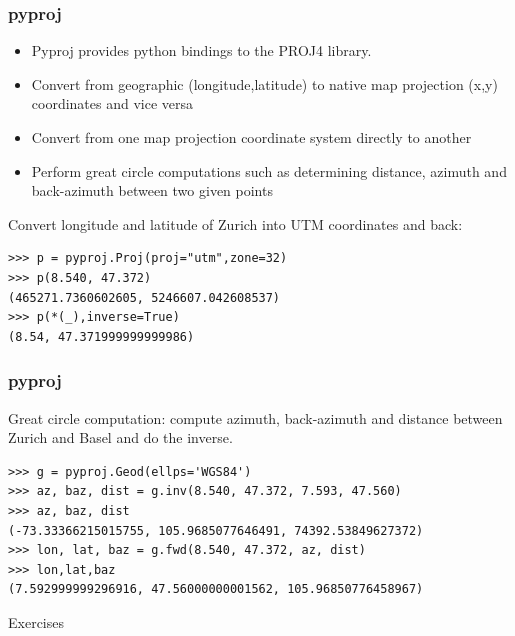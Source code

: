 \begin{frame}[fragile]
\frametitle{pyproj}
\begin{itemize}
  \item Pyproj provides python bindings to the PROJ4 library.
  \item Convert from geographic (longitude,latitude)
	to native map projection (x,y) coordinates and vice versa
   \item Convert from one map projection coordinate system directly to another
   \item Perform great circle computations such as determining distance, azimuth
   and back-azimuth between two given points
\end{itemize}

Convert longitude and latitude of Zurich into UTM coordinates and back:
 \begin{myColorBox}{0.9}{}
\begin{verbatim}
>>> p = pyproj.Proj(proj="utm",zone=32)
>>> p(8.540, 47.372)
(465271.7360602605, 5246607.042608537)
>>> p(*(_),inverse=True)
(8.54, 47.371999999999986)
\end{verbatim}
\end{myColorBox}
\end{frame}

\begin{frame}[fragile]
\frametitle{pyproj}
Great circle computation: compute azimuth, back-azimuth and distance between
Zurich and Basel and do the inverse.
\begin{myColorBox}{1.0}{}
\begin{verbatim}
>>> g = pyproj.Geod(ellps='WGS84')
>>> az, baz, dist = g.inv(8.540, 47.372, 7.593, 47.560)
>>> az, baz, dist
(-73.33366215015755, 105.9685077646491, 74392.53849627372)
>>> lon, lat, baz = g.fwd(8.540, 47.372, az, dist)
>>> lon,lat,baz
(7.592999999296916, 47.56000000001562, 105.96850776458967)
\end{verbatim}
\end{myColorBox}
\end{frame}

\begin{frame}
\begin{center}
\Huge{Exercises}
\end{center}
\end{frame}

